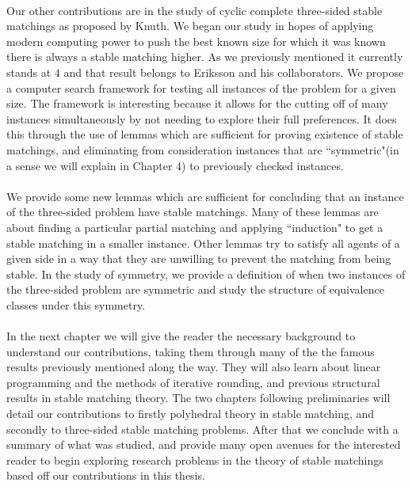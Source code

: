 \paragraph{}
Our other contributions are in the study of cyclic complete three-sided stable matchings as proposed by Knuth. We began our study in hopes of applying modern computing power to push the best known size for which it was known there is always a stable matching higher. As we previously mentioned it currently stands at $4$ and that result belongs to Eriksson and his collaborators. We propose a computer search framework for testing all instances of the problem for a given size. The framework is interesting because it allows for the cutting off of many instances simultaneously by not needing to explore their full preferences. It does this through the use of lemmas which are sufficient for proving existence of stable matchings, and eliminating from consideration instances that are ``symmetric"(in a sense we will explain in Chapter $4$) to previously checked instances. 
\paragraph{}
We provide some new lemmas which are sufficient for concluding that an instance of the three-sided problem have stable matchings. Many of these lemmas are about finding a particular partial matching and applying ``induction" to get a stable matching in a smaller instance. Other lemmas try to satisfy all agents of a given side in a way that they are unwilling to prevent the matching from being stable. In the study of symmetry, we provide a definition of when two instances of the three-sided problem are symmetric and study the structure of equivalence classes under this symmetry.
\paragraph{}
In the next chapter we will give the reader the necessary background to understand our contributions, taking them through many of the the famous results previously mentioned along the way. They will also learn about linear programming and the methods of iterative rounding, and previous structural results in stable matching theory. The two chapters following preliminaries will detail our contributions to firstly polyhedral theory in stable matching, and secondly to three-sided stable matching problems. After that we conclude with a summary of what was studied, and provide many open avenues for the interested reader to begin exploring research problems in the theory of stable matchings based off our contributions in this thesis.
